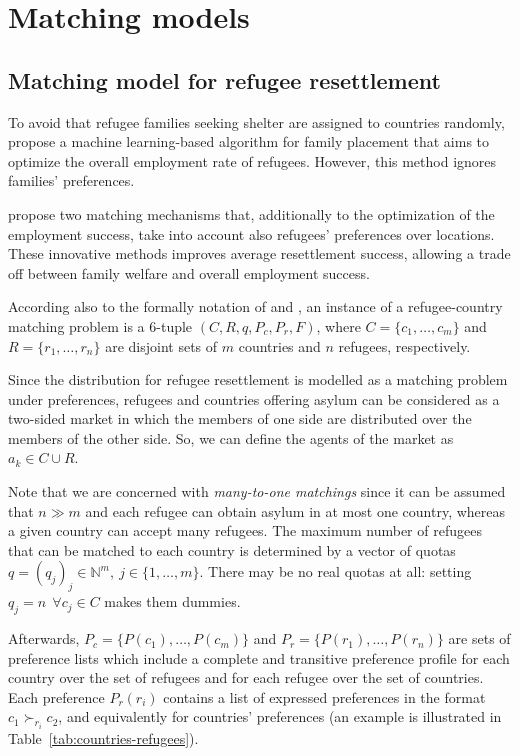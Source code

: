\section{Matching models}\label{matching-models}%


\subsection{Matching model for refugee resettlement}\label{matching-model-for-refugee-resettlement}%

To avoid that refugee families seeking shelter are assigned to countries randomly, \citet{bansak_2018} propose a machine learning-based algorithm for family placement that aims to optimize the overall employment rate of refugees. However, this method ignores families’ preferences.

\citet{olbergml} propose two matching mechanisms that, additionally to the optimization of the employment success, take into account also refugees’ preferences over locations. These innovative methods improves average resettlement success, allowing a trade off between family welfare and overall employment success.

According also to the formally notation of \citet{salles} and \citet{delacretaz_2020}, an instance of a refugee-country matching problem is a 6-tuple \((C, R, q, P_c, P_r, F)\), where \(C = \{c_1, \dots, c_m\}\) and \(R = \{r_1, \dots, r_n\}\) are disjoint sets of \(m\) countries and \(n\) refugees, respectively.

Since the distribution for refugee resettlement is modelled as a matching problem under preferences, refugees and countries offering asylum can be considered as a two-sided market in which the members of one side are distributed over the members of the other side. So, we can define the agents of the market as \(a_k \in C \cup R\).

Note that we are concerned with \textit{many-to-one matchings} since it can be assumed that \(n \gg m\) and each refugee can obtain asylum in at most one country, whereas a given country can accept many refugees. The maximum number of refugees that can be matched to each country is determined by a vector of quotas \(q = (q_j)_j \in \mathbb{N}^m,\ j \in \{1, \dots, m\}\). There may be no real quotas at all: setting \(q_j = n\ \ \forall c_j \in C\) makes them dummies.

Afterwards, \(P_c = \{P(c_1), \dots, P(c_m)\}\) and \(P_r =\{P(r_1), \dots, P(r_n)\}\) are sets of preference lists which include a complete and transitive preference profile for each country over the set of refugees and for each refugee over the set of countries. Each preference \(P_r(r_i)\) contains a list of expressed preferences in the format \(c_1 \succ_{r_i} c_2\), and equivalently for countries' preferences (an example is illustrated in Table~\ref{tab:countries-refugees}).

